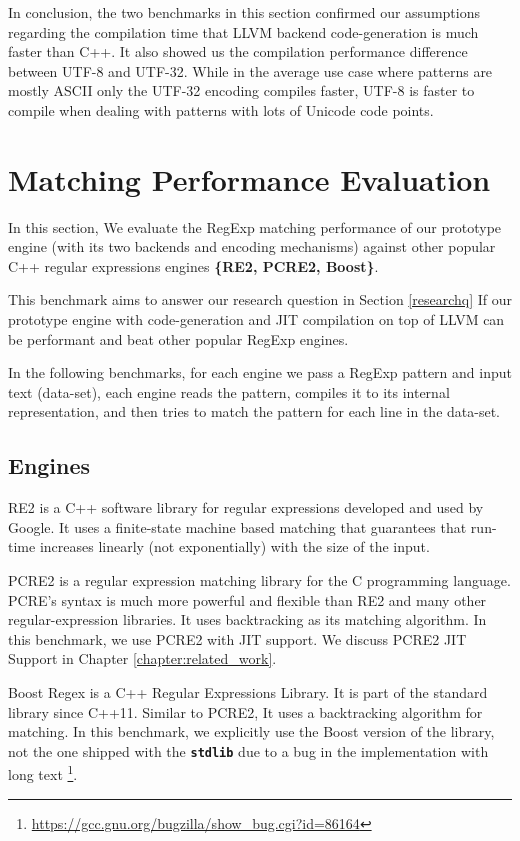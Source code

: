 In conclusion, the two benchmarks in this section confirmed our assumptions regarding the compilation time that LLVM backend code-generation is much faster than C++. It also showed us the compilation performance difference between UTF-8 and UTF-32. While in the average use case where patterns are mostly ASCII only the UTF-32 encoding compiles faster, UTF-8 is faster to compile when dealing with patterns with lots of Unicode code points.

\section{Matching Performance Evaluation}

In this section, We evaluate the RegExp matching performance of our prototype engine (with its two backends and encoding mechanisms) against other popular C++ regular expressions engines \textbf{\{RE2, PCRE2, Boost\}}.

This benchmark aims to answer our research question in Section \ref{researchq} If our prototype engine with code-generation and JIT compilation on top of LLVM can be performant and beat other popular RegExp engines.

In the following benchmarks, for each engine we pass a RegExp pattern and input text (data-set), each engine reads the pattern, compiles it to its internal representation, and then tries to match the pattern for each line in the data-set.

\subsection{Engines}
RE2 \cite{re2} is a C++ software library for regular expressions developed and used by Google. It uses a finite-state machine based matching that guarantees that run-time increases linearly (not exponentially) with the size of the input.

PCRE2 \cite{pcre2} is a regular expression matching library for the C programming language. PCRE's syntax is much more powerful and flexible than RE2 and many other regular-expression libraries. It uses backtracking as its matching algorithm. In this benchmark, we use PCRE2 with JIT support. We discuss PCRE2 JIT Support in Chapter \ref{chapter:related_work}.

Boost Regex \cite{Boost} is a C++ Regular Expressions Library. It is part of the standard library since C++11. Similar to PCRE2, It uses a backtracking algorithm for matching. In this benchmark, we explicitly use the Boost version of the library, not the one shipped with the \texttt{\textbf{stdlib}} due to a bug in the implementation with long text \footnote{\url{https://gcc.gnu.org/bugzilla/show\_bug.cgi?id=86164}}.

